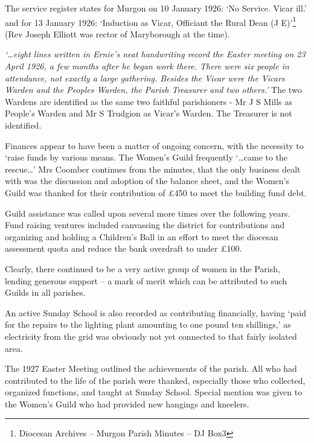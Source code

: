 The service register states for Murgon on 10 January 1926: `No Service. Vicar ill.' and for 13 January 1926: `Induction as Vicar, Officiant the Rural Dean (J E)'\footnote{Diocesan Archives -- Murgon Parish Minutes -- DJ Box3} (Rev Joseph Elliott was rector of Maryborough at the time).


\emph{`\ldots eight lines written in Ernie's neat handwriting record the Easter meeting on 23 April 1926, a few months after he began work there. There were six people in attendance, not exactly a large gathering. Besides the Vicar were the Vicars Warden and the Peoples Warden, the Parish Treasurer and two others.'} The two Wardens are identified as the same two faithful parishioners - Mr J S Mills as People's Warden and Mr S Trudgion as Vicar's Warden. The Treasurer is not identified.



Finances appear to have been a matter of ongoing concern, with the necessity to `raise funds by various means. The Women's Guild frequently `\ldots came to the rescue\ldots' Mrs Coomber continues from the minutes, that the only business dealt with was the discussion and adoption of the balance sheet, and the Women's Guild was thanked for their contribution of \pounds450 to meet the building fund debt.



Guild assistance was called upon several more times over the following years. Fund raising ventures included canvassing the district for contributions and organizing and holding a Children's Ball in an effort to meet the diocesan assessment quota and reduce the bank overdraft to under \pounds100.



Clearly, there continued to be a very active group of women in the Parish, lending generous support -- a mark of merit which can be attributed to such Guilds in all parishes.



An active Sunday School is also recorded as contributing financially, having `paid for the repairs to the lighting plant amounting to one pound ten shillings,' as electricity from the grid was obviously not yet connected to that fairly isolated area.



The 1927 Easter Meeting outlined the achievements of the parish. All who had contributed to the life of the parish were thanked, especially those who collected, organized functions, and taught at Sunday School. Special mention was given to the Women's Guild who had provided new hangings and kneelers.



